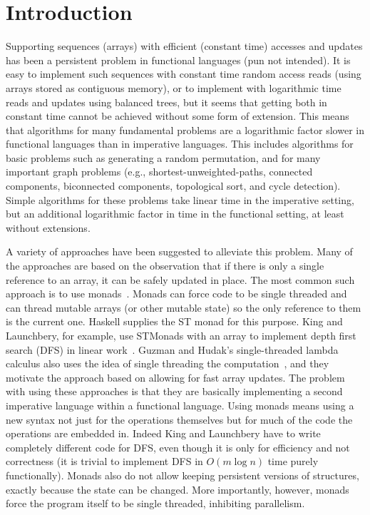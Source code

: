 \section{Introduction}
\label{sec:intro}

Supporting sequences (arrays) with efficient (constant time)
accesses and updates has been a persistent problem in functional languages
(pun not intended).  It is easy to implement such sequences with constant
time random access reads (using arrays stored as contiguous memory),
or to implement with logarithmic time reads and updates using balanced
trees, but it seems that getting both in constant time cannot be
achieved without some
form of extension.
This means that algorithms
for many fundamental problems are a logarithmic factor slower in
functional languages than in imperative languages.  This includes
algorithms for basic problems such as generating a random permutation,
and for many important graph problems (e.g.,
shortest-unweighted-paths, connected components, biconnected
components, topological sort, and cycle detection).  Simple algorithms
for these problems take linear time in the imperative setting, but an
additional logarithmic factor in time in the functional setting, at
least without extensions.

A variety of approaches have been suggested to alleviate this problem.
Many of the approaches are based on the observation that if there is
only a single reference to an array, it can be safely updated in
place.  The most common such approach is to use
monads~\cite{Moggi89,Wadler95}.  Monads can force code to be single
threaded and can thread mutable arrays (or other mutable
state) so the only reference to them is the current one.
Haskell supplies the ST monad for this purpose.  King and Launchbery,
for example, use STMonads with an array to implement depth first 
search (DFS) in linear work~\cite{KL95}.  Guzman and Hudak's single-threaded
lambda calculus also uses the idea of single threading the
computation~\cite{GH90}, and they motivate the approach based on allowing
for fast array updates.  The problem with using these approaches is
that they are basically implementing a second imperative language within
a functional language.  Using monads means using a new syntax not just
for the operations themselves but for much of the code the operations are
embedded in.  Indeed King and Launchbery have to write completely
different code for DFS, even though it is only for efficiency and not
correctness (it is trivial to implement DFS in $O(m \log n)$ time
purely functionally).  Monads also do not allow keeping persistent
versions of structures, exactly because the state can be changed.
More importantly, however, monads force the program itself to be single
threaded, inhibiting parallelism.

